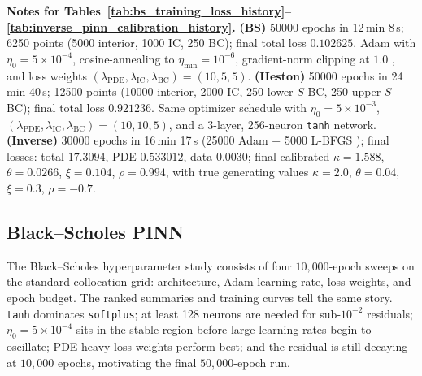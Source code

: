 \noindent\footnotesize
\textbf{Notes for Tables~\ref{tab:bs_training_loss_history}--\ref{tab:inverse_pinn_calibration_history}.}
\textbf{(BS)} 50000 epochs in 12\,min 8\,s; 6250 points (5000 interior, 1000 IC, 250 BC); final total loss $0.102625$. Adam with $\eta_0=5\times 10^{-4}$, cosine-annealing \parencite{loshchilov2017sgdr} to $\eta_{\min}=10^{-6}$, gradient-norm clipping at $1.0$ \parencite{pascanu2013difficulty}, and loss weights $(\lambda_{\text{PDE}},\lambda_{\text{IC}},\lambda_{\text{BC}})=(10,5,5)$.
\textbf{(Heston)} 50000 epochs in 24\,min 40\,s; 12500 points (10000 interior, 2000 IC, 250 lower-$S$ BC, 250 upper-$S$ BC); final total loss $0.921236$. Same optimizer schedule with $\eta_0=5\times 10^{-3}$, $(\lambda_{\text{PDE}},\lambda_{\text{IC}},\lambda_{\text{BC}})=(10,10,5)$, and a 3-layer, 256-neuron \texttt{tanh} network.
\textbf{(Inverse)} 30000 epochs in 16\,min 17\,s (25000 Adam + 5000 L-BFGS \parencite{liu1989limited}); final losses: total $17.3094$, PDE $0.533012$, data $0.0030$; final calibrated $\kappa=1.588$, $\theta=0.0266$, $\xi=0.104$, $\rho=0.994$, with true generating values $\kappa=2.0$, $\theta=0.04$, $\xi=0.3$, $\rho=-0.7$.
\normalsize


\subsection{Black--Scholes PINN}

The Black--Scholes hyperparameter study consists of four $10{,}000$-epoch sweeps on the standard collocation grid: architecture, Adam learning rate, loss weights, and epoch budget. The ranked summaries and training curves tell the same story. \texttt{tanh} dominates \texttt{softplus}; at least 128 neurons are needed for sub-$10^{-2}$ residuals; $\eta_0=5\times10^{-4}$ sits in the stable region before large learning rates begin to oscillate; PDE-heavy loss weights perform best; and the residual is still decaying at $10{,}000$ epochs, motivating the final $50{,}000$-epoch run.

